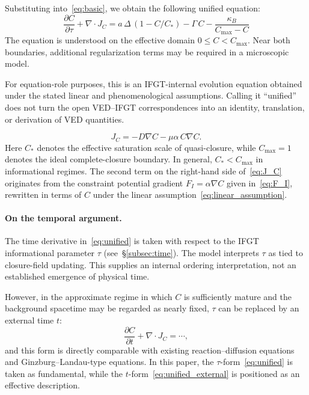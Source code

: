 Substituting into~\eqref{eq:basic}, we obtain the following unified equation:
\begin{equation}
\boxed{
\frac{\partial C}{\partial \tau} + \nabla \cdot J_C
= a \, \Delta \, \left(1 - C/C_*\right) - \Gamma \, C - \frac{\kappa_B}{C_{\max} - C}
}
\label{eq:unified}
\end{equation}
The equation is understood on the effective domain
$0 \le C < C_{\max}$.
Near both boundaries, additional regularization terms may be required in
a microscopic model.

For equation-role purposes, this is an IFGT-internal evolution equation
obtained under the stated linear and phenomenological assumptions. Calling it
``unified'' does not turn the open VED--IFGT correspondences into an identity,
translation, or derivation of VED quantities.

\begin{equation}
J_C = -D \nabla C - \mu \alpha \, C \nabla C.
\label{eq:J_C}
\end{equation}
Here $C_*$ denotes the effective saturation scale of quasi-closure,
while $C_{\max}=1$ denotes the ideal complete-closure boundary.
In general, $C_* < C_{\max}$ in informational regimes.
The second term on the right-hand side of~\eqref{eq:J_C} originates from the constraint potential gradient $F_I = \alpha \nabla C$ given in~\eqref{eq:F_I}, rewritten in terms of $C$ under the linear assumption~\eqref{eq:linear_assumption}.

\paragraph{On the temporal argument.}
The time derivative in~\eqref{eq:unified} is taken with respect to the IFGT
informational parameter $\tau$ (see~§\ref{subsec:time}).  The model interprets
$\tau$ as tied to closure-field updating.  This supplies an internal ordering
interpretation, not an established emergence of physical time.

However, in the approximate regime in which $C$ is sufficiently mature and the background spacetime may be regarded as nearly fixed, $\tau$ can be replaced by an external time $t$:
\begin{equation}
\frac{\partial C}{\partial t} + \nabla \cdot J_C = \cdots,
\label{eq:unified_external}
\end{equation}
and this form is directly comparable with existing reaction--diffusion equations and Ginzburg--Landau-type equations. In this paper, the $\tau$-form~\eqref{eq:unified} is taken as fundamental, while the $t$-form~\eqref{eq:unified_external} is positioned as an effective description.

